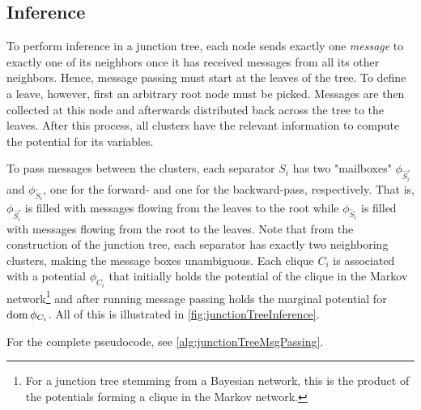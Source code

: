 		\subsection{Inference}
			\label{subsec:junctionTreeInference}

			To perform inference in a junction tree, each node sends exactly one \emph{message} to exactly one of its neighbors once it has received messages from all its other neighbors. Hence, message passing must start at the leaves of the tree. To define a leave, however, first an arbitrary root node must be picked. Messages are then collected at this node and afterwards distributed back across the tree to the leaves. After this process, all clusters have the relevant information to compute the potential for its variables.

			To pass messages between the clusters, each separator \(S_i\) has two "mailboxes" \( \phi_{\overrightarrow{S_i}} \) and \( \phi_{\overleftarrow{S_i}} \), one for the forward- and one for the backward-pass, respectively. That is, \( \phi_{\overrightarrow{S_i}} \) is filled with messages flowing from the leaves to the root while \( \phi_{\overleftarrow{S_i}} \) is filled with messages flowing from the root to the leaves. Note that from the construction of the junction tree, each separator has exactly two neighboring clusters, making the message boxes unambiguous. Each clique \( C_i \) is associated with a potential \( \phi_{C_i} \) that initially holds the potential of the clique in the Markov network\footnote{For a junction tree stemming from a Bayesian network, this is the product of the potentials forming a clique in the Markov network.} and after running message passing holds the marginal potential for \( \operatorname{dom} \phi_{C_i} \). All of this is illustrated in \autoref{fig:junctionTreeInference}.

			For the complete pseudocode, see \autoref{alg:junctionTreeMsgPassing}.

